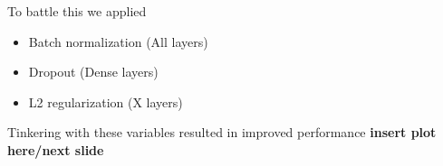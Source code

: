 \documentclass{beamer}
\begin{document}
\begin{frame}
  To battle this we applied
  \begin{itemize}
    \item Batch normalization (All layers)
    \item Dropout (Dense layers)
    \item L2 regularization (X layers)
  \end{itemize}
  Tinkering with these variables resulted in improved performance \textbf{insert plot here/next slide}
\end{frame}
\end{document}
